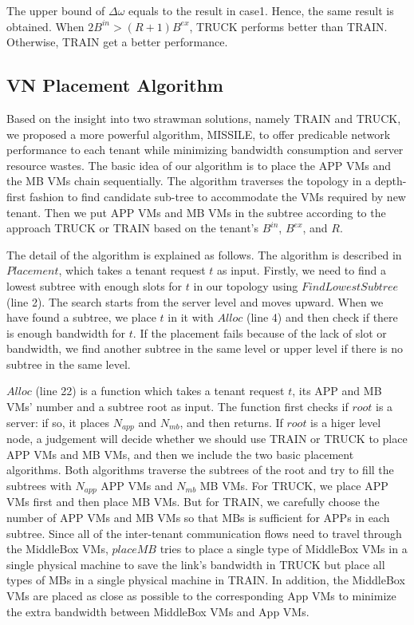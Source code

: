 \documentclass[10pt, conference, letterpaper]{IEEEtran}
\begin{document}
The upper bound of $\Delta \omega$ equals to the result in case1. Hence, the same result is obtained. When $2B^{in} > (R+1)B^{ex}$, TRUCK performs better than TRAIN. Otherwise, TRAIN get a better performance.

\subsection{VN Placement Algorithm}
Based on the insight into two strawman solutions, namely TRAIN and TRUCK, we proposed a more powerful algorithm, MISSILE, to offer predicable network performance to each tenant while minimizing bandwidth consumption and server resource wastes. The basic idea of our algorithm is to place the APP VMs and the MB VMs chain sequentially. The algorithm traverses the topology in a depth-first fashion to find candidate sub-tree to accommodate the VMs required by new tenant. Then we put APP VMs and MB VMs in the subtree according to the approach TRUCK or TRAIN based on the tenant's $B^{in}$, $B^{ex}$, and $R$. 

The detail of the algorithm is explained as follows. The algorithm is described in $Placement$, which takes a tenant request $t$ as input. Firstly, we need to find a lowest subtree with enough slots for $t$ in our topology using $FindLowestSubtree$ (line 2). The search starts from the server level and moves upward. When we have found a subtree, we place $t$ in it with $Alloc$ (line 4) and then check if there is enough bandwidth for $t$. If the placement fails because of the lack of slot or bandwidth, we find another subtree in the same level or upper level if there is no subtree in the same level.

$Alloc$ (line 22) is a function which takes a tenant request $t$, its APP and MB VMs' number and a subtree root as input. The function first checks if $root$ is a server: if so, it places $N_{app}$ and $N_{mb}$, and then returns. If $root$ is a higer level node, a judgement will decide whether we should use TRAIN or TRUCK to place APP VMs and MB VMs, and then we include the two basic placement algorithms. Both algorithms traverse the subtrees of the root and try to fill the subtrees with $N_{app}$ APP VMs and $N_{mb}$ MB VMs. For TRUCK, we place APP VMs first and then place MB VMs. But for TRAIN, we carefully choose the number of APP VMs and MB VMs so that MBs is sufficient for APPs in each subtree. Since all of the inter-tenant communication flows need to travel through the MiddleBox VMs, $placeMB$ tries to place  a single type of MiddleBox VMs in a single physical machine to save the link's bandwidth in TRUCK but place all types of MBs in a single physical machine in TRAIN. In addition, the MiddleBox VMs are placed as close as possible to the corresponding App VMs to minimize the extra bandwidth between MiddleBox VMs and App VMs.
\end{document}
